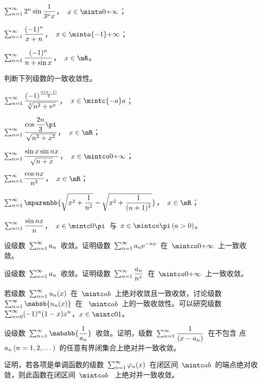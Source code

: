 \begin{exercise}
\begin{exlistcols}
  \item $\sum_{n=1}^\infty2^n\sin\dfrac1{3^nx}$，~$x\in\minto0\pinf$；
  \item $\sum_{n=1}^\infty\dfrac{(-1)^n}{x+n}$，~$x\in\minto{-1}\pinf$；
  \item $\sum_{n=1}^\infty\dfrac{(-1)^n}{n+\sin x}$，~$x\in\mR$。
\end{exlistcols}
\item 判断下列级数的一致收敛性。
\begin{exlistcols}
  \item $\sum_{n=1}^\infty\dfrac{(-1)^{\frac{n(n-1)}2}}{\sqrt[3]{n^2+\mathrm e^x}}$，~$x\in\mintc{-a}a$；
  \item $\sum_{n=1}^\sinf\dfrac{\cos\dfrac{2n}3\pi}{\sqrt{n^2+x^2}}$，~$x\in\mR$；
  \item $\sum_{n=1}^\infty\dfrac{\sin x\sin nx}{\sqrt{n+x}}$，~$x\in\mintco0\pinf$；
  \item $\sum_{n=1}^\infty\dfrac{\cos nx}{n^3}$，~$x\in\mR$；
  \item $\sum_{n=1}^\sinf\mparenbb{\sqrt{x^2+\dfrac1{n^2}}-\sqrt{x^2+\dfrac1{\smash[b]{(n+1)^2}}}}$，~$x\in\mR$；
  \item $\sum_{n=1}^\infty\dfrac{\sin nx}n$，~$x\in\mintc0\pi$~与~$x\in\mintc a\pi\mcond{a>0}$。
\end{exlistcols}
\item 设级数~$\sum_{n=1}^\infty a_n$~收敛。证明级数~$\sum_{n=1}^\infty a_n\mathrm e^{-nx}$~在~$\mintco0\pinf$~上一致收敛。
\item 设级数~$\sum_{n=1}^\infty a_n$~收敛。证明级数~$\sum_{n=1}^\infty\dfrac{a_n}{n^x}$~在~$\mintco0\pinf$~上一致收敛。
\item 若级数~$\sum_{n=1}^\infty u_n(x)$~在~$\mintc ab$~上绝对收敛且一致收敛，讨论级数~$\sum_{n=1}^\sinf\mabsb{u_n(x)}$~在
~$\mintc ab$~上的一致收敛性。可以研究级数~$\sum_{n=0}^\infty(-1)^n(1-x)x^n$，$x\in\mintc01$。
\item 设级数~$\sum_{n=1}^\sinf\mabsbb{\dfrac1{a_n}}$~收敛。证明，级数~$\sum_{n=1}^\infty\dfrac1{(x-a_n)}$~在不包含
点~$a_n\mcond{n=1,2,\dotsc}$~的任意有界闭集合上绝对并一致收敛。
\item 证明，若各项是单调函数的级数~$\sum_{n=1}^\infty\varphi_n(x)$~在闭区间~$\mintc ab$~的端点绝对收敛，则此函数在闭区间~$\mintc ab$~
上绝对并一致收敛。
\end{exercise}

